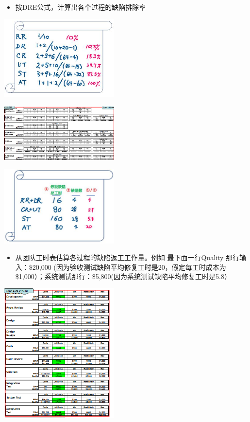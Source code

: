 \begin{itemize}
\tightlist
\item
  按DRE公式，计算出各个过程的缺陷排除率
\end{itemize}


\includegraphics[width=6cm]{2DreEstimateScreenshot_2021-12-01_2120491.jpg}

\includegraphics[width=6cm]{sjb1.PNG}




\includegraphics[width=6cm]{4reworkByPhaseScreenshot_2021-12-01_2148381.jpg}

\begin{itemize}
\tightlist
\item
  从团队工时表估算各过程的缺陷返工工作量。例如 最下面一行Quality
  那行输入：\$20,000 (因为验收测试缺陷平均修复工时是20，假定每工时成本为
  \$1,000）；系统测试那行：\$5,800(因为系统测试缺陷平均修复工时是5.8）
\end{itemize}

\includegraphics[width=6cm]{微信截图_20231031153355.png}


